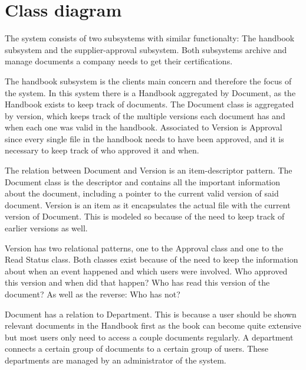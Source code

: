\section{Class diagram}


The system consists of two subsystems with similar functionalty:
The handbook subsystem and the supplier-approval subsystem.
Both subsystems archive and manage documents a company needs to get their certifications.

The handbook subsystem is the clients main concern and therefore the focus of the system. 
In this system there is a Handbook aggregated by Document, as the Handbook exists to keep track of documents. The Document class is aggregated by version, which keeps track of the multiple versions each document has and when each one was valid in the handbook. Associated to Version is Approval since every single file in the handbook needs to have been approved, and it is necessary to keep track of who approved it and when.

The relation between Document and Version is an item-descriptor pattern. The Document class is the descriptor and contains all the important information about the document, including a pointer to the current valid version of said document. Version is an item as it encapsulates the actual file with the current version of Document. This is modeled so because of the need to keep track of earlier versions as well.

Version has two relational patterns, one to the Approval class and one to the Read Status class. Both classes exist because of the need to keep the information about when an event happened and which users were involved. Who approved this version and when did that happen? Who has read this version of the document? As well as the reverse: Who has not?

Document has a relation to Department. This is because a user should be shown relevant documents in the Handbook first as the book can become quite extensive but most users only need to access a couple documents regularly. A department connects a certain group of documents to a certain group of users. These departments are managed by an administrator of the system.

